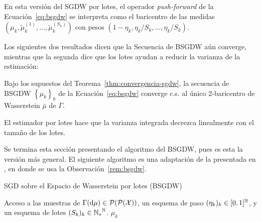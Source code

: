 \begin{remark}\label{rem:bsgdw}
    En esta versión del SGDW por lotes, el operador \textit{push-forward} de la Ecuación~\eqref{eq:bsgdw} se interpreta como el baricentro de las medidas $(\mu_k, \tilde \mu_k^{(1)}, \ldots, \tilde \mu_k^{(S_k)})$ con pesos $(1 - \eta_k, \eta_k/S_k, \ldots, \eta_k/S_k)$.
\end{remark}

Los siguientes dos resultados dicen que la Secuencia de BSGDW aún converge, mientras que la segunda dice que los lotes ayudan a reducir la varianza de la estimación:

\begin{proposition}
    Bajo los supuestos del Teorema~\ref{thm:convergencia-sgdw}, la secuencia de BSGDW $\left\{ \mu_k \right\}_k$ de la Ecuación~\eqref{eq:bsgdw} converge c.s. al único 2-baricentro de Wasserstein $\bar \mu$ de $\Gamma$.
\end{proposition}

\begin{proposition}
    El estimador por lotes hace que la varianza integrada decrezca linealmente con el tamaño de los lotes.
\end{proposition}

Se termina esta sección presentando el algoritmo del BSGDW, pues es esta la versión más general. El siguiente algoritmo es una adaptación de la presentada en \cite{backhoff2022bayesian}, en donde se usa la Observación~\ref{rem:bsgdw}.
\begin{algorithm}[H]
    \caption{SGD sobre el Espacio de Wasserstein por lotes (BSGDW) \cite{backhoff2022bayesian}}
    \label{alg:bsgdw}
    \begin{algorithmic}[1]
        \Require Acceso a las muestras de $\Gamma(\dd \mu) \in \ProbSpace[\ProbSpace]$, un esquema de paso $(\eta_k)_k \in [0, 1]^\N$, y un esquema de lotes $(S_k)_k \in {\N_\ast}^\N$.
        \Repeat
         
        \State\Return $\mu_k$
    \end{algorithmic}
\end{algorithm}


